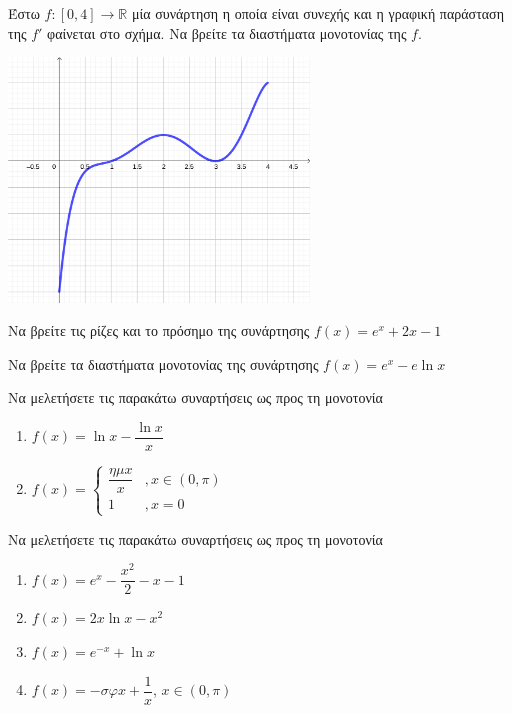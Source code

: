 \documentclass{presentation}
\begin{document}
\begin{askisi}
  Έστω $f:[0,4]\to\mathbb{R}$ μία συνάρτηση η οποία είναι συνεχής και η γραφική παράσταση της $f'$ φαίνεται στο σχήμα. Να βρείτε τα διαστήματα μονοτονίας της $f$.

  \centering
  \includegraphics[width=0.6\textwidth]{"images/2.6.2 Μονοτονία.png"}

\end{askisi}

\begin{askisi}
  Να βρείτε τις ρίζες και το πρόσημο της συνάρτησης $f(x)=e^x+2x-1$

\end{askisi}

\begin{askisi}
  Να βρείτε τα διαστήματα μονοτονίας της συνάρτησης $f(x)=e^x-e\ln x$

\end{askisi}

\begin{askisi}
  Να μελετήσετε τις παρακάτω συναρτήσεις ως προς τη μονοτονία
  \begin{enumerate}
    \item<1-> $f(x)=\ln x-\dfrac{\ln x}{x}$
    \item<2-> $f(x)=\begin{cases}
              \dfrac{ημx}{x} & ,x\in (0,\pi) \\
              1              & ,x=0
            \end{cases}$
  \end{enumerate}

\end{askisi}

\begin{askisi}
  Να μελετήσετε τις παρακάτω συναρτήσεις ως προς τη μονοτονία
  \begin{enumerate}
    \item<1-> $f(x)=e^x-\dfrac{x^2}{2}-x-1$
    \item<2-> $f(x)=2x\ln x-x^2$
    \item<3-> $f(x)=e^{-x}+\ln x$
    \item<4-> $f(x)=-σφx+\dfrac{1}{x}$, $x\in (0,\pi)$
  \end{enumerate}

\end{askisi}
\end{document}
